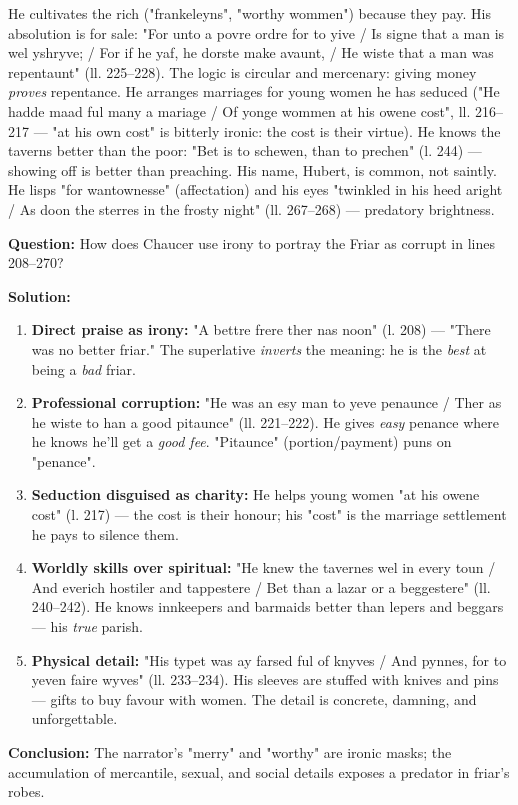 \documentclass[11pt]{article}
\newcommand{\cle}[1]{{\popxbold\color{popdark}#1}}
\begin{document}
He cultivates the rich ("frankeleyns", "worthy wommen") because they pay. His \cle{absolution} is for sale: "For unto a povre ordre for to yive / Is signe that a man is wel yshryve; / For if he yaf, he dorste make avaunt, / He wiste that a man was repentaunt" (ll. 225–228). The logic is circular and mercenary: giving money \emph{proves} repentance. He arranges marriages for young women he has seduced ("He hadde maad ful many a mariage / Of yonge wommen at his owene cost", ll. 216–217 — "at his own cost" is bitterly ironic: the cost is their virtue). He knows the taverns better than the poor: "Bet is to schewen, than to prechen" (l. 244) — showing off is better than preaching. His name, \cle{Hubert}, is common, not saintly. He lisps "for wantownesse" (affectation) and his eyes "twinkled in his heed aright / As doon the sterres in the frosty night" (ll. 267–268) — predatory brightness.

\begin{exoresolu}
\textbf{Question:} How does Chaucer use irony to portray the Friar as corrupt in lines 208–270?

\textbf{Solution:}
\begin{enumerate}
\item \textbf{Direct praise as irony:} "A bettre frere ther nas noon" (l. 208) — "There was no better friar." The superlative \emph{inverts} the meaning: he is the \emph{best} at being a \emph{bad} friar.
\item \textbf{Professional corruption:} "He was an esy man to yeve penaunce / Ther as he wiste to han a good pitaunce" (ll. 221–222). He gives \emph{easy} penance where he knows he'll get a \emph{good fee}. "Pitaunce" (portion/payment) puns on "penance".
\item \textbf{Seduction disguised as charity:} He helps young women "at his owene cost" (l. 217) — the cost is their honour; his "cost" is the marriage settlement he pays to silence them.
\item \textbf{Worldly skills over spiritual:} "He knew the tavernes wel in every toun / And everich hostiler and tappestere / Bet than a lazar or a beggestere" (ll. 240–242). He knows innkeepers and barmaids better than lepers and beggars — his \emph{true} parish.
\item \textbf{Physical detail:} "His typet was ay farsed ful of knyves / And pynnes, for to yeven faire wyves" (ll. 233–234). His sleeves are stuffed with knives and pins — gifts to buy favour with women. The detail is concrete, damning, and unforgettable.
\end{enumerate}
\textbf{Conclusion:} The narrator's "merry" and "worthy" are ironic masks; the accumulation of mercantile, sexual, and social details exposes a predator in friar's robes.
\end{exoresolu}
\end{document}
